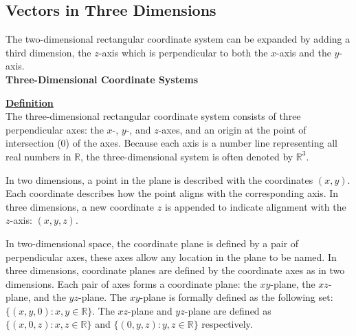 \documentclass[a4paper]{article}
\let\bf\textbf
\begin{document}
\subsection{Vectors in Three Dimensions}
The two-dimensional rectangular coordinate system can be expanded by adding a third dimension, the $z$-axis which is perpendicular to both the $x$-axis and the $y$-axis.
\vspace{2mm}\\
\bf{Three-Dimensional Coordinate Systems}
\begin{shaded}
    \noindent\underline{\bf{Definition}}
    \vspace{2mm}\\
    The three-dimensional rectangular coordinate system consists of three perpendicular axes: the $x$-, $y$-, and $z$-axes, and an origin at the point of intersection (0) of the axes. Because each axis is a number line representing all real numbers in $\mathbb{R}$, the three-dimensional system is often denoted by $\mathbb{R}^3$.
\end{shaded}
\noindent In two dimensions, a point in the plane is described with the coordinates $(x,y)$. Each coordinate describes how the point aligns with the corresponding axis. In three dimensions, a new coordinate $z$ is appended to indicate alignment with the $z$-axis: $(x,y,z)$.
\begin{center}
\end{center}
In two-dimensional space, the coordinate plane is defined by a pair of perpendicular axes, these axes allow any location in the plane to be named. In three dimensions, coordinate planes are defined by the coordinate axes as in two dimensions. Each pair of axes forms a coordinate plane: the $xy$-plane, the $xz$-plane, and the $yz$-plane. The $xy$-plane is formally defined as the following set: $\{(x,y,0):x,y\in\mathbb{R}\}$. The $xz$-plane and $yz$-plane are defined as $\{(x,0,z):x,z\in\mathbb{R}\}$ and $\{(0,y,z):y,z\in\mathbb{R}\}$ respectively.
\end{document}
